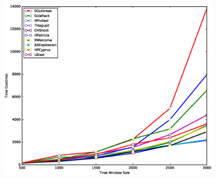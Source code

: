 \documentclass{llncs}
\begin{document}
\begin{figure}
    \centering
    \includegraphics[scale=0.5]{window-timecost.eps}

\end{figure}
\end{document}

